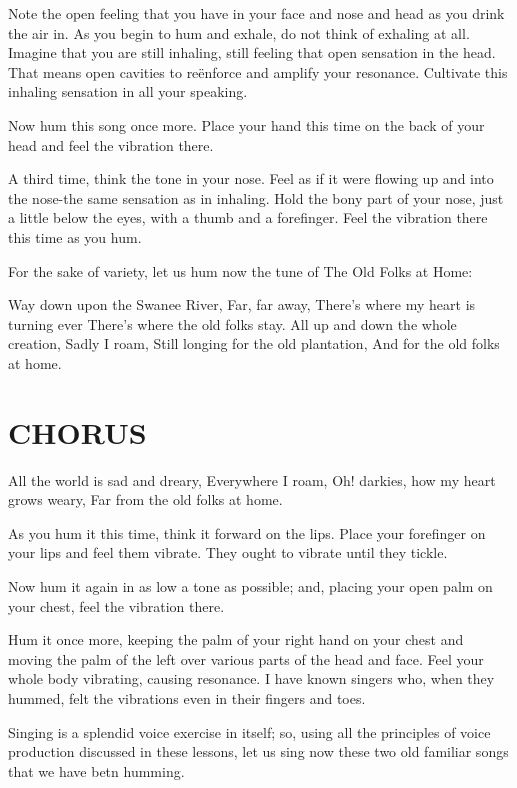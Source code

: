 \documentclass[10pt]{article}
\begin{document}
Note the open feeling that you have in your face and nose and head as you drink the air in. As you begin to hum and exhale, do not think of exhaling at all. Imagine that you are still inhaling, still feeling that open sensation in the head. That means open cavities to reënforce and amplify your resonance. Cultivate this inhaling sensation in all your speaking.

Now hum this song once more. Place your hand this time on the back of your head and feel the vibration there.

A third time, think the tone in your nose. Feel as if it were flowing up and into the nose-the same sensation as in inhaling. Hold the bony part of your nose, just a little below the eyes, with a thumb and a forefinger. Feel the vibration there this time as you hum.

For the sake of variety, let us hum now the tune of The Old Folks at Home:

\begin{displayquote}
Way down upon the Swanee River, Far, far away, There's where my heart is turning ever There's where the old folks stay. All up and down the whole creation, Sadly I roam, Still longing for the old plantation, And for the old folks at home.
\end{displayquote}

\section*{CHORUS}
All the world is sad and dreary, Everywhere I roam, Oh! darkies, how my heart grows weary, Far from the old folks at home.

As you hum it this time, think it forward on the lips. Place your forefinger on your lips and feel them vibrate. They ought to vibrate until they tickle.

Now hum it again in as low a tone as possible; and, placing your open palm on your chest, feel the vibration there.

Hum it once more, keeping the palm of your right hand on your chest and moving the palm of the left over various parts of the head and face. Feel your whole body vibrating, causing resonance. I have known singers who, when they hummed, felt the vibrations even in their fingers and toes.

Singing is a splendid voice exercise in itself; so, using all the principles of voice production discussed in these lessons, let us sing now these two old familiar songs that we have betn humming.
\end{document}

